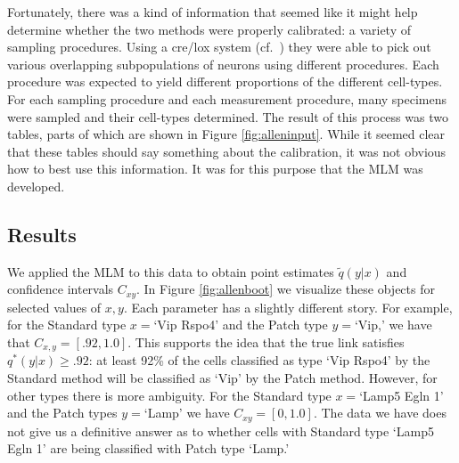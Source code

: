 Fortunately, there was a kind of information that seemed like it might help determine whether the two methods were properly calibrated: a variety of sampling procedures.  Using a cre/lox system (cf.\ \citep{tasic2017shared}) they were able to pick out various overlapping subpopulations of neurons using different procedures.  Each procedure was expected to yield different proportions of the different cell-types.  For each sampling procedure and each measurement procedure, many specimens were sampled and their cell-types determined.  The result of this process was two tables, parts of which are shown in Figure \ref{fig:alleninput}.  While it seemed clear that these tables should say something about the calibration, it was not obvious how to best use this information.  It was for this purpose that the MLM was developed.

\subsection{Results}


We applied the MLM to this data to obtain point estimates $\tilde q(y|x)$ and confidence intervals $C_{x y}$.  In Figure \ref{fig:allenboot} we visualize these objects for selected values of $x,y$.  Each parameter has a slightly different story.  For example, for the Standard type $x=$`Vip Rspo4' and the Patch type $y=$`Vip,' we have that $C_{x,y}=[.92,1.0]$.  This supports the idea that the true link satisfies $q^*(y|x)\geq .92$: at least 92\% of the cells classified as type `Vip Rspo4' by the Standard method will be classified as `Vip' by the Patch method.  However, for other types there is more ambiguity.  For the Standard type $x=$`Lamp5 Egln 1' and the Patch types $y=$`Lamp' we have $C_{x y}=[0,1.0]$.  The data we have does not give us a definitive answer as to whether cells with Standard type `Lamp5 Egln 1' are being classified with Patch type `Lamp.'

